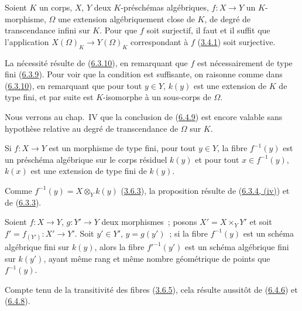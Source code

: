 \begin{proposition}[6.4.9]
\label{I.6.4.9-fr}
Soient $K$ un corps, $X$, $Y$ deux $K$-préschémas algébriques, $f:X\to Y$ un
$K$-morphisme, $\Omega$ une extension algébriquement close de $K$, de degré
de transcendance infini sur $K$. Pour que $f$ soit surjectif, il faut et il
suffit que l'application $X(\Omega)_K\to Y(\Omega)_K$ correspondant à $f$
(\hyperref[I.3.4.1-fr]{3.4.1}) soit surjective.
\end{proposition}

La nécessité résulte de (\hyperref[I.6.3.10-fr]{6.3.10}), en remarquant que
$f$ est nécessairement de type fini (\hyperref[I.6.3.9-fr]{6.3.9}). Pour voir
que la condition est suffisante, on raisonne comme dans
(\hyperref[I.6.3.10-fr]{6.3.10}), en remarquant que pour tout $y\in Y$,
$k(y)$ est une extension de $K$ de type fini, et par suite est $K$-isomorphe
à un sous-corps de $\Omega$.

\begin{remark}[6.4.10]
\label{I.6.4.10-fr}
Nous verrons au chap.~IV que la conclusion de
(\hyperref[I.6.4.9-fr]{6.4.9}) est encore valable sans hypothèse relative au
degré de transcendance de $\Omega$ sur $K$.
\end{remark}

\begin{proposition}[6.4.11]
\label{I.6.4.11-fr}
Si $f:X\to Y$ est un morphisme de type fini, pour tout $y\in Y$, la fibre
$f^{-1}(y)$ est un préschéma algébrique sur le corps résiduel $k(y)$ et pour
tout $x\in f^{-1}(y)$, $k(x)$ est une extension de type fini de $k(y)$.
\end{proposition}

Comme $f^{-1}(y)=X\otimes_Y k(y)$
(\hyperref[I.3.6.3-fr]{3.6.3}), la proposition résulte de
(\hyperref[I.6.3.4-fr]{6.3.4, (iv)}) et de
(\hyperref[I.6.3.3-fr]{6.3.3}).

\begin{proposition}[6.4.12]
\label{I.6.4.12-fr}
Soient $f:X\to Y$, $g:Y'\to Y$ deux morphismes~; posons
$X'=X\times_Y Y'$ et soit $f'=f_{(Y')}:X'\to Y'$. Soit $y'\in Y'$,
$y=g(y')$~; si la fibre $f^{-1}(y)$ est un schéma algébrique fini sur $k(y)$,
alors la fibre $f'^{-1}(y')$ est un schéma algébrique fini sur $k(y')$, ayant
même rang et même nombre géométrique de points que $f^{-1}(y)$.
\end{proposition}

Compte tenu de la transitivité des fibres
(\hyperref[I.3.6.5-fr]{3.6.5}), cela résulte aussitôt de
(\hyperref[I.6.4.6-fr]{6.4.6}) et
(\hyperref[I.6.4.8-fr]{6.4.8}).

